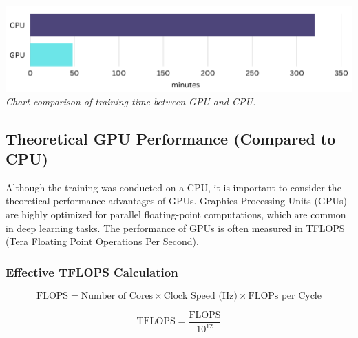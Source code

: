 \vspace{1em}
\begin{center} 
    \includegraphics[width=\textwidth]{../assets/07-results/graph-cpu-vs-gpu.png} 
    \small\textit{Chart comparison of training time between GPU and CPU.} 
\end{center}
\vspace{1em} 


\subsection{Theoretical GPU Performance (Compared to CPU)}

Although the training was conducted on a CPU, it is important to consider the theoretical 
performance advantages of GPUs. Graphics Processing Units (GPUs) are highly optimized for parallel 
floating-point computations, which are common in deep learning tasks. The performance of GPUs is 
often measured in TFLOPS (Tera Floating Point Operations Per Second).


\subsubsection*{Effective TFLOPS Calculation} 

\[
\text{FLOPS} = \text{Number of Cores} \times \text{Clock Speed (Hz)} \times \text{FLOPs per Cycle}
\]

\[
\text{TFLOPS} = \frac{\text{FLOPS}}{10^{12}}
\]

